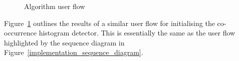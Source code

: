 \begin{figure}
    \caption{Algorithm user flow\label{fig:gui_CHD}}
\end{figure}

Figure~\ref{fig:gui_CHD} outlines the results of a similar user flow for
initialising the co-occurrence histogram detector. This is essentially the same
as the user flow highlighted by the sequence diagram in Figure~\ref{implementation_sequence_diagram}. 



